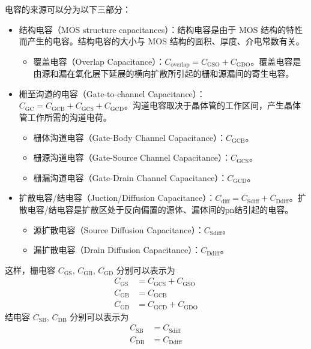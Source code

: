 电容的来源可以分为以下三部分：
\begin{itemize}
    \item 结构电容（MOS structure capacitances）：结构电容是由于 MOS 结构的特性而产生的电容。结构电容的大小与 MOS 结构的面积、厚度、介电常数有关。
    \begin{itemize}
        \item 覆盖电容（Overlap Capacitance）：$C_{\mathrm{overlap}} = C_{\mathrm{GSO}} + C_{\mathrm{GDO}}$。覆盖电容是由源和漏在氧化层下延展的横向扩散所引起的栅和源漏间的寄生电容。
    \end{itemize}
    \item 栅至沟道的电容（Gate-to-channel Capacitance）：$C_{\mathrm{GC}} = C_{\mathrm{GCB}} + C_{\mathrm{GCS}} + C_{\mathrm{GCD}}$。沟道电容取决于晶体管的工作区间，产生晶体管工作所需的沟道电荷。
    \begin{itemize}
        \item 栅体沟道电容（Gate-Body Channel Capacitance）：$C_{\mathrm{GCB}}$。
        \item 栅源沟道电容（Gate-Source Channel Capacitance）：$C_{\mathrm{GCS}}$。
        \item 栅漏沟道电容（Gate-Drain Channel Capacitance）：$C_{\mathrm{GCD}}$。
    \end{itemize}
    \item 扩散电容/结电容（Juction/Diffusion Capacitance）：$C_{\mathrm{diff}} = C_{\mathrm{Sdiff}} + C_{\mathrm{Ddiff}}$。扩散电容/结电容是扩散区处于反向偏置的源体、漏体间的pn结引起的电容。
    \begin{itemize}
        \item 源扩散电容（Source Diffusion Capacitance）：$C_{\mathrm{Sdiff}}$。
        \item 漏扩散电容（Drain Diffusion Capacitance）：$C_{\mathrm{Ddiff}}$。
    \end{itemize}
\end{itemize}

这样，栅电容 $C_{\mathrm{GS}}$, $C_{\mathrm{GB}}$, $C_{\mathrm{GD}}$ 分别可以表示为
\begin{equation}
    \begin{aligned}
        C_{\mathrm{GS}} &= C_{\mathrm{GCS}} + C_{\mathrm{GSO}} \\
        C_{\mathrm{GB}} &= C_{\mathrm{GCB}} \\
        C_{\mathrm{GD}} &= C_{\mathrm{GCD}} + C_{\mathrm{GDO}}
    \end{aligned}
\end{equation}
结电容 $C_{\mathrm{SB}}$, $C_{\mathrm{DB}}$ 分别可以表示为
\begin{equation}
    \begin{aligned}
        C_{\mathrm{SB}} &= C_{\mathrm{Sdiff}} \\
        C_{\mathrm{DB}} &= C_{\mathrm{Ddiff}}
    \end{aligned}
\end{equation}

